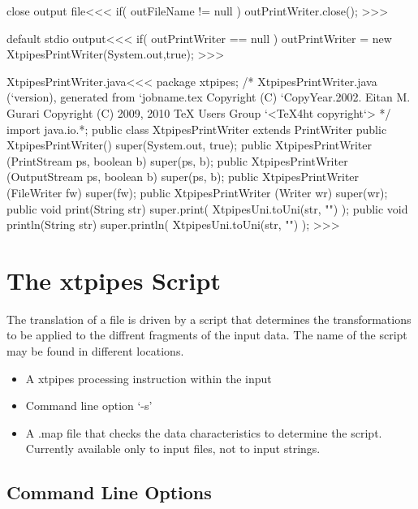 \documentclass{article}
\begin{document}
{\<close output file\><<<
if( outFileName != null ){
   outPrintWriter.close();
}
>>>

\<default stdio output\><<<
if( outPrintWriter == null ){
   outPrintWriter = new XtpipesPrintWriter(System.out,true);
}
>>>

% 

\<XtpipesPrintWriter.java\><<<
package xtpipes;
/* XtpipesPrintWriter.java (`version), generated from `jobname.tex
   Copyright (C) `CopyYear.2002. Eitan M. Gurari
   Copyright (C) 2009, 2010 TeX Users Group
`<TeX4ht copyright`> */
import java.io.*;
public class XtpipesPrintWriter extends PrintWriter {
   public XtpipesPrintWriter() {
     super(System.out, true);
   }
   public XtpipesPrintWriter (PrintStream ps, boolean b){
     super(ps, b);
   }
   public XtpipesPrintWriter (OutputStream ps, boolean b){
     super(ps, b);
   }
   public XtpipesPrintWriter (FileWriter fw){
     super(fw);
   }
   public XtpipesPrintWriter (Writer wr){
     super(wr);
   }
   public void print(String str) {
     super.print( XtpipesUni.toUni(str, "") );
   }
   public void println(String str) {
     super.println( XtpipesUni.toUni(str, "") );
}  }
>>>





\section{The xtpipes Script}


The translation of a file is driven by a script that determines the
transformations to be applied to the diffrent fragments of the input
data.  The name of the script may be found in different locations.

\begin{itemize}
\item
A xtpipes processing instruction within the input
\item
Command line option `-s'
\item
A .map  file that checks the data characteristics to determine the
script. Currently available only to input files, not to input strings.
\end{itemize}



\subsection{Command Line Options}


}
\end{document}
